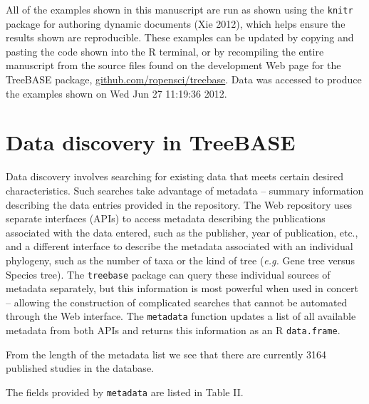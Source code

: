 \begin{Shaded}
\begin{Highlighting}[]
\end{Highlighting}
\end{Shaded}
All of the examples shown in this manuscript are run as shown using the
\texttt{knitr} package for authoring dynamic documents (Xie 2012), which
helps ensure the results shown are reproducible. These examples can be
updated by copying and pasting the code shown into the R terminal, or by
recompiling the entire manuscript from the source files found on the
development Web page for the TreeBASE package,
\href{https://github.com/ropensci/treebase}{github.com/ropensci/treebase}.
Data was accessed to produce the examples shown on Wed Jun 27 11:19:36
2012.

\section{Data discovery in TreeBASE}

Data discovery involves searching for existing data that meets certain
desired characteristics. Such searches take advantage of metadata --
summary information describing the data entries provided in the
repository. The Web repository uses separate interfaces (APIs) to access
metadata describing the publications associated with the data entered,
such as the publisher, year of publication, etc., and a different
interface to describe the metadata associated with an individual
phylogeny, such as the number of taxa or the kind of tree (\emph{e.g.}
Gene tree versus Species tree). The \texttt{treebase} package can query
these individual sources of metadata separately, but this information is
most powerful when used in concert -- allowing the construction of
complicated searches that cannot be automated through the Web interface.
The \texttt{metadata} function updates a list of all available metadata
from both APIs and returns this information as an R \texttt{data.frame}.

\begin{Shaded}
\begin{Highlighting}[]
\NormalTok{()}
\end{Highlighting}
\end{Shaded}
From the length of the metadata list we see that there are currently
3164 published studies in the database.

The fields provided by \texttt{metadata} are listed in Table II.

